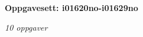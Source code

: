 \centerline{\bf Oppgavesett: i01620no-i01629no}
\vskip 10pt
\centerline{\it 10 oppgaver}\vskip 10pt
\vskip 10pt
